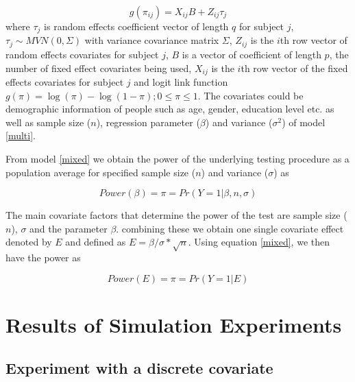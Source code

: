 \documentclass{article}
\begin{document}
\begin{equation} 
g(\pi_{ij}) = X_{ij}B  + Z_{ij} \tau_j 
\label{mixed} 
\end{equation}
%
where $\tau_j$ is random effects coefficient vector of length $q$ for subject $j$,  $\tau_j  \sim  MVN(0,\Sigma)$ with variance covariance matrix $\Sigma$, $Z_{ij}$ is the $i$th row vector of random effects covariates for subject $j$, $B$ is a vector of coefficient of length $p$, the number of fixed effect covariates being used, $X_{ij}$ is the $i$th row vector of the fixed effects covariates for subject $j$ and logit link function $g(\pi)=\log(\pi) - \log(1-\pi); 0 \le \pi \le 1$. The covariates could be demographic information of people such as age, gender, education level etc. as well as sample size ($n$), regression parameter ($\beta$) and variance ($\sigma^2$) of model \ref{multi}. 

From model \ref{mixed} we obtain %
the power of the underlying testing procedure as a population average %
for specified sample size ($n$) and  variance ($\sigma$)  as 

\begin{equation}\label{eqn:power} 
Power(\beta) = \pi=Pr(Y=1|\beta, n, \sigma) 
\end{equation}

The main covariate factors that determine the power of the test are sample size ($n$), $\sigma$ and the parameter $\beta$. combining these we obtain one single covariate effect denoted by $E$ and defined as $E = \beta/ \sigma*\sqrt{n}$. Using equation \ref{mixed}, we then have the power as

\begin{equation}\label{eqn:effect} 
Power(E) = \pi=Pr(Y=1| E) 
\end{equation}



\section{Results of Simulation Experiments} \label{sec:simulation}

\subsection{Experiment with a discrete covariate}
\end{document}
